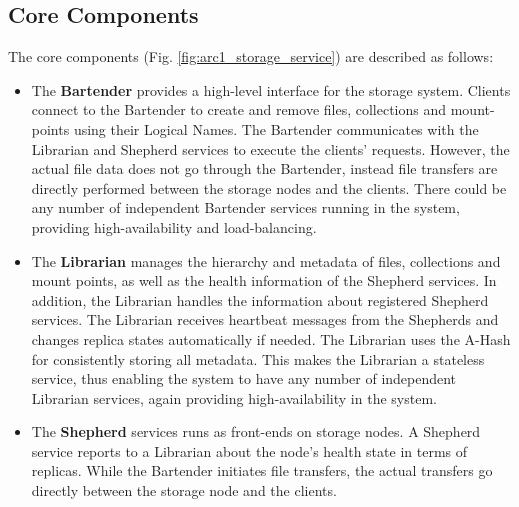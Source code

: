 \documentclass{llncs}
\begin{document}
\subsection{Core Components} 
The core components (Fig. \ref{fig:arc1_storage_service}) are
described as follows:
\begin{itemize}

\item The \textbf{Bartender} %
provides a high-level interface for the storage
system. Clients connect to the Bartender to create and remove
files, collections and mount-points using their Logical Names. The
Bartender communicates 
with the Librarian and Shepherd services to execute the clients'
requests. However, the actual file data does not go through the
Bartender, instead file
transfers are directly performed between the storage nodes and the
clients. There could be any number of independent Bartender services
running in the system, providing high-availability and
load-balancing. 


\item  The {\bf Librarian} 
manages the hierarchy and metadata of
files, collections and mount points, as well as the health information of the Shepherd
services. In addition, the Librarian handles
the information about registered Shepherd services. The Librarian receives
heartbeat messages from the Shepherds and changes replica states automatically
if needed. The Librarian uses the A-Hash for consistently storing all metadata. This makes the
Librarian a stateless service, thus enabling the system to have any
number of independent
Librarian services, again providing high-availability in the
system.


\item The {\bf Shepherd} services 
runs as front-ends on storage nodes. A Shepherd
service reports to a Librarian about the 
node's health state in terms of replicas. While the Bartender initiates
file transfers, the actual transfers go directly between the storage node
and the clients.
 

\end{itemize}
\end{document}
